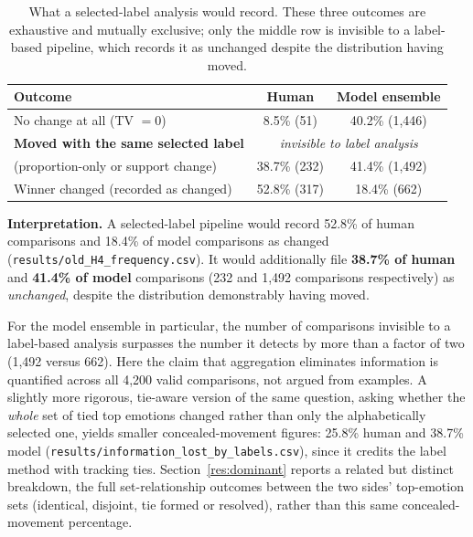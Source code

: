 \begin{table}[h]
\centering
\footnotesize
\caption{What a selected-label analysis would record. These three outcomes are exhaustive and
mutually exclusive; only the middle row is invisible to a label-based pipeline, which records it
as unchanged despite the distribution having moved.}
\label{tab:vectorization}
\begin{tabular}{lcc}
\hline
\textbf{Outcome} & \textbf{Human} & \textbf{Model ensemble} \\
\hline
No change at all (TV $=0$) & 8.5\% (51) & 40.2\% (1{,}446) \\
\textbf{Moved with the same selected label} & \multicolumn{2}{c}{\emph{invisible to label analysis}} \\
\hphantom{x}(proportion-only or support change) & 38.7\% (232) & 41.4\% (1{,}492) \\
Winner changed (recorded as changed) & 52.8\% (317) & 18.4\% (662) \\
\hline
\end{tabular}
\end{table}

\noindent
\textbf{Interpretation.} A selected-label pipeline would record 52.8\% of human comparisons and
18.4\% of model comparisons as changed (\texttt{results/\allowbreak old\_\allowbreak H4\_\allowbreak frequency.csv}). It would
additionally file \textbf{38.7\% of
human} and \textbf{41.4\% of model} comparisons (232 and 1{,}492 comparisons respectively) as
\emph{unchanged}, despite the distribution demonstrably having moved.

For the model ensemble in particular, the number of comparisons invisible to a label-based
analysis surpasses the number it detects by more than a factor of two (1{,}492 versus 662). Here
the claim that aggregation eliminates information is quantified across all 4{,}200 valid
comparisons, not argued from examples. A slightly more rigorous, tie-aware version of the same
question, asking whether the \emph{whole} set of tied top emotions changed rather than only the
alphabetically selected one, yields smaller concealed-movement figures: 25.8\% human and 38.7\%
model (\texttt{results/\allowbreak information\_\allowbreak lost\_\allowbreak by\_\allowbreak labels.csv}), since it credits the label method
with tracking ties. Section~\ref{res:dominant} reports a related but distinct breakdown, the full
set-relationship outcomes between the two sides' top-emotion sets (identical, disjoint, tie formed
or resolved), rather than this same concealed-movement percentage.

